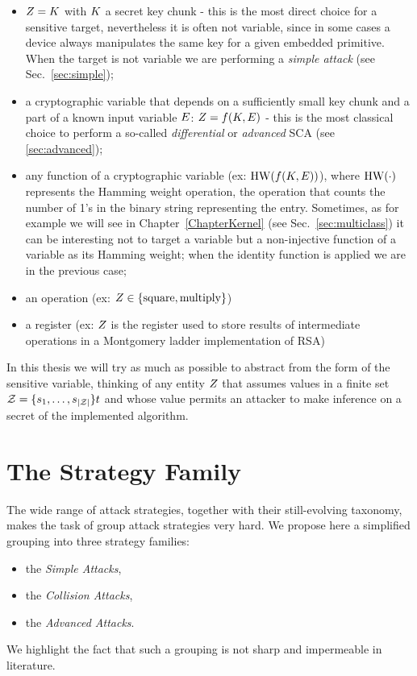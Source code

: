 \begin{itemize}
\item $Z = K$ with $K$ a secret key chunk - this is the most direct choice for a sensitive target, nevertheless it is often not variable, since in some cases a device always manipulates the same key for a given embedded primitive. When the target is not variable we are performing a \emph{simple attack} (see Sec.~\ref{sec:simple});
\item a cryptographic variable that depends on a sufficiently small key chunk and a part of a known input variable $E$: $Z = f(K,E)$ - this is the most classical choice to perform a so-called \emph{differential} or \emph{advanced} SCA (see \ref{sec:advanced});
\item any function of a cryptographic variable (ex: $\mathrm{HW}(f(K,E))$), where $\mathrm{HW}(\cdot)$ represents the Hamming weight operation, \ie the operation that counts the number of 1's in the binary string representing the entry. Sometimes, as for example we will see in Chapter~\ref{ChapterKernel} (see Sec.~\ref{sec:multiclass}) it can be interesting not to target a variable but a non-injective function of a variable as its Hamming weight; when the identity function is applied we are in the previous case;
\item an operation (ex: $Z \in \{\mathrm{square}, \mathrm{multiply}\}$)
\item a register (ex: $Z$ is the register used to store results of intermediate operations in a Montgomery ladder implementation of RSA)
\end{itemize}
In this thesis we will try as much as possible to abstract from the form of the sensitive variable, thinking of any entity $Z$ that assumes values in a finite set $\mathcal{Z}=\{s_{1}, \dots, s_{\lvert\mathcal{Z}\rvert}\}t$ and whose value permits an attacker to make inference on a secret of the implemented algorithm.

\section{The Strategy Family}\label{sec:strategies}
The wide range of attack strategies, together with their still-evolving taxonomy, makes the task of group attack strategies very hard. We propose here a simplified grouping into three strategy families: 
\begin{itemize}
\item  the \emph{Simple Attacks},
\item the \emph{Collision Attacks}, 
\item the \emph{Advanced Attacks}.
\end{itemize}  
We highlight the fact that such a grouping is not sharp and impermeable in literature. 


